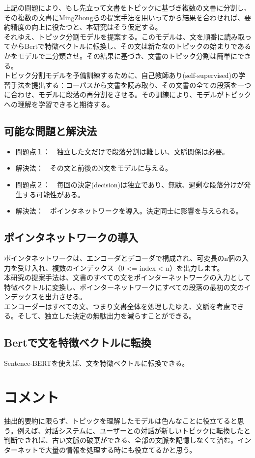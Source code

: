 \documentclass[a4paper]{article}
\begin{document}
上記の問題により、もし先立って文書をトピックに基づき複数の文書に分割し、その複数の文書にMingZhongらの提案手法を用いってから結果を合わせれば、要約精度の向上に役たつと、本研究はそう仮定する。\\

それゆえ、トピック分割モデルを提案する。このモデルは、文を順番に読み取ってからBertで特徴ベクトルに転換し、その文は新たなのトピックの始まりであるかをモデルで二分類させ。その結果に基づき、文書のトピック分割は簡単にできる。\\

トピック分割モデルを予備訓練するために、自己教師あり(self-supervised)の学習手法を提出する：コーパスから文書を読み取り、その文書の全ての段落を一つに合わせ、モデルに段落の再分割をさせる。その訓練により、モデルがトピックへの理解を学習できると期待する。\\

\subsection{可能な問題と解決法}
\begin{itemize}
\item 問題点１：　独立した文だけで段落分割は難しい、文脈関係は必要。
\item 解決法：　その文と前後のN文をモデルに与える。
\item 問題点２：　毎回の決定(decision)は独立であり、無駄、過剰な段落分けが発生する可能性がある。
\item 解決法：　ポインタネットワークを導入。決定同士に影響を与えられる。
\end{itemize}

\subsection{ポインタネットワークの導入}

ポインタネットワークは、エンコーダとデコーダで構成され、可変長のn個の入力を受け入れ、複数のインデックス（0 <= index < n）を出力します。\\

本研究の提案手法は、文書のすべての文をポインターネットワークの入力として特徴ベクトルに変換し、ポインターネットワークにすべての段落の最初の文のインデックスを出力させる。\\

エンコーダーはすべての文、つまり文書全体を処理したゆえ、文脈を考慮できる。そして、独立した決定の無駄出力を減らすことができる。\\

\subsection{Bertで文を特徴ベクトルに転換}

Sentence-BERTを使えば、文を特徴ベクトルに転換できる。

\section{コメント}

抽出的要約に限らず、トピックを理解したモデルは色んなことに役立てると思う。例えば、対話システムに、ユーザーとの対話が新しいトピックに転換したと判断できれば、古い文脈の破棄ができる、全部の文脈を記憶しなくて済む。インターネットで大量の情報を処理する時にも役立てるかと思う。
\end{document}
